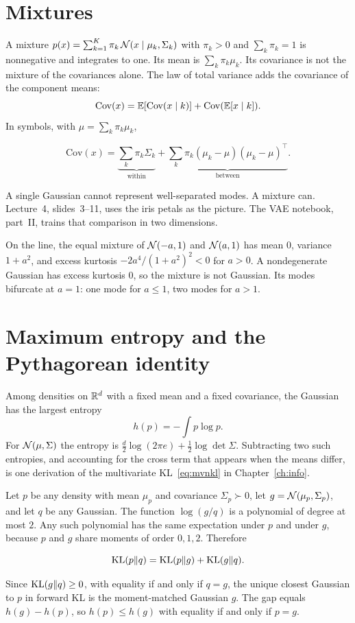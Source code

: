 \section{Mixtures}

A mixture $p(x)=\sum_{k=1}^K \pi_k\,\mathcal{N}(x\mid\mu_k,\Sigma_k)$ with $\pi_k>0$ and $\sum_k\pi_k=1$ is nonnegative and integrates to one. Its mean is $\sum_k\pi_k\mu_k$. Its covariance is not the mixture of the covariances alone. The law of total variance adds the covariance of the component means:
\[
\mathrm{Cov}(x)=\mathbb{E}[\mathrm{Cov}(x\mid k)]+\mathrm{Cov}(\mathbb{E}[x\mid k]).
\]
In symbols, with $\mu=\sum_k\pi_k\mu_k$,
\begin{resultbox}
\[
\mathrm{Cov}(x)
=\underbrace{\sum_k\pi_k\Sigma_k}_{\text{within}}
+\underbrace{\sum_k\pi_k(\mu_k-\mu)(\mu_k-\mu)^\top}_{\text{between}}.
\]
\end{resultbox}
A single Gaussian cannot represent well-separated modes. A mixture can. Lecture~4, slides~3--11, uses the iris petals as the picture. The VAE notebook, part~II, trains that comparison in two dimensions.

On the line, the equal mixture of $\mathcal{N}(-a,1)$ and $\mathcal{N}(a,1)$ has mean $0$, variance $1+a^2$, and excess kurtosis $-2a^4/(1+a^2)^2<0$ for $a>0$. A nondegenerate Gaussian has excess kurtosis $0$, so the mixture is not Gaussian. Its modes bifurcate at $a=1$: one mode for $a\le 1$, two modes for $a>1$.

\section{Maximum entropy and the Pythagorean identity}

Among densities on $\mathbb{R}^d$ with a fixed mean and a fixed covariance, the Gaussian has the largest entropy
\[
h(p)=-\int p\log p.
\]
For $\mathcal{N}(\mu,\Sigma)$ the entropy is $\tfrac{d}{2}\log(2\pi e)+\tfrac12\log\det\Sigma$. Subtracting two such entropies, and accounting for the cross term that appears when the means differ, is one derivation of the multivariate KL~\eqref{eq:mvnkl} in Chapter~\ref{ch:info}.

Let $p$ be any density with mean $\mu_p$ and covariance $\Sigma_p\succ 0$, let $g=\mathcal{N}(\mu_p,\Sigma_p)$, and let $q$ be any Gaussian. The function $\log(g/q)$ is a polynomial of degree at most $2$. Any such polynomial has the same expectation under $p$ and under $g$, because $p$ and $g$ share moments of order $0,1,2$. Therefore
\begin{resultbox}
\[
\mathrm{KL}(p\Vert q)=\mathrm{KL}(p\Vert g)+\mathrm{KL}(g\Vert q).
\]
\end{resultbox}
Since $\mathrm{KL}(g\Vert q)\ge 0$, with equality if and only if $q=g$, the unique closest Gaussian to $p$ in forward KL is the moment-matched Gaussian $g$. The gap equals $h(g)-h(p)$, so $h(p)\le h(g)$ with equality if and only if $p=g$.

